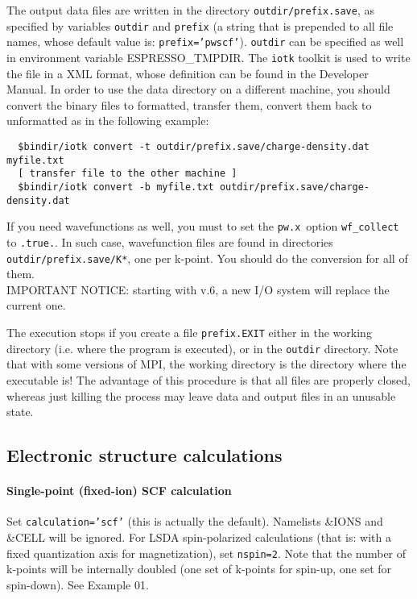\documentclass[12pt,a4paper]{article}
\def\pwx{\texttt{pw.x}}
\begin{document}
The output data files are written in the directory \texttt{outdir/prefix.save}, as specified by variables
\texttt{outdir} and \texttt{prefix} 
(a string that is prepended
to all file names, whose default value is: \texttt{prefix='pwscf'}). \texttt{outdir} can be specified
as well in environment variable ESPRESSO\_TMPDIR. The \texttt{iotk}
toolkit is used to write the file in a XML format, whose definition can
be found in the Developer Manual. In order to use the data directory
on a different machine, you should convert the binary files to formatted,
transfer them, convert them back to unformatted as in the following 
example:
\begin{verbatim}
  $bindir/iotk convert -t outdir/prefix.save/charge-density.dat myfile.txt
  [ transfer file to the other machine ]
  $bindir/iotk convert -b myfile.txt outdir/prefix.save/charge-density.dat
\end{verbatim}
If you need wavefunctions as well, you must to set the \pwx\ option 
\texttt{wf\_collect} to \texttt{.true.}. In such case, wavefunction files 
are found in directories \texttt{outdir/prefix.save/K*}, one per k-point.
You should do the conversion for all of them.\\
IMPORTANT NOTICE: starting with v.6, a new I/O system will replace the 
current one. 

The execution stops if you create a file \texttt{prefix.EXIT} either
in the working directory (i.e. where the program is executed), or in
the  \texttt{outdir} directory. Note that with some versions of MPI,
the working directory  is the directory where the executable is! 
The advantage of this procedure is that all files are properly closed, 
whereas  just killing the process may leave data and output files in 
an unusable state.

\subsection{Electronic structure calculations}
\paragraph{Single-point (fixed-ion) SCF calculation} 
Set \texttt{calculation='scf'} (this is actually the default).
Namelists \&IONS and \&CELL will be ignored. For LSDA spin-polarized 
calculations (that is: with a fixed quantization axis for magnetization),
set \texttt{nspin=2}. Note that the number of k-points will be internally
doubled (one set of k-points for spin-up, one set for spin-down).
See Example 01.
\end{document}
